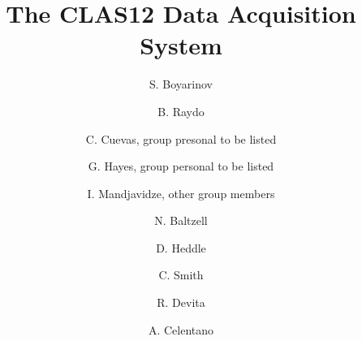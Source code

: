 \title{The CLAS12 Data Acquisition System}

\author[A]{S. Boyarinov}
\author[A]{B. Raydo}
\author[A]{C. Cuevas, group presonal to be listed}
\author[A]{G. Hayes, group personal to be listed}
\author[B]{I. Mandjavidze, other group members}
\author[A]{N. Baltzell}
\author[A]{D. Heddle}
\author[A]{C. Smith}
\author[C]{R. Devita}
\author[C]{A. Celentano}

\address[A]{Thomas Jefferson National Accelerator Facility, Newport News, VA, USA}
\address[B]{Sacley, France}
\address[C]{INFN, Milan, Italy}
